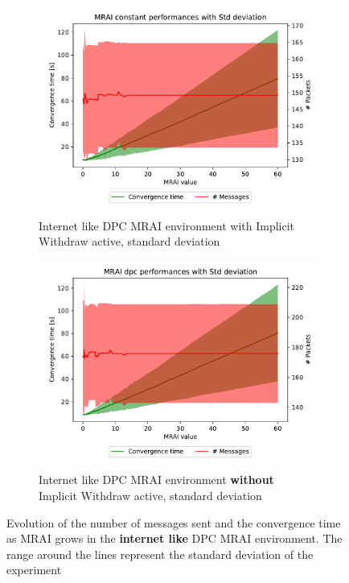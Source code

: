 \documentclass[10pt,conference,letterpaper]{IEEEtran}
\newcommand{\figwidth}{0.78}
\newcommand{\figvspace}{-1.5em}
\begin{document}
\begin{figure}[tb]
	\centering

	\begin{subfigure}{\columnwidth}
		\centering
		\includegraphics[width=\figwidth\columnwidth]{images/internet_like/graph-100-dpc/mrai_evolution_std_alpha}
		\caption{Internet like \ac{DPC} \ac{MRAI} environment with Implicit Withdraw active, standard deviation}
		\label{fig:dpc_mrai_evolution_IW_std}
		\qquad
	\end{subfigure}

	\begin{subfigure}{\columnwidth}
		\centering
		\includegraphics[width=\figwidth\columnwidth]{images/internet_like/graph-100-dpc-noIW/mrai_evolution_std_alpha}
		\caption{Internet like \ac{DPC} \ac{MRAI} environment \textbf{without} Implicit Withdraw active, standard deviation}
		\label{fig:dpc_mrai_evolution_noIW_std}
		\qquad
	\end{subfigure}

	\caption{Evolution of the number of messages sent and the convergence time as \ac{MRAI} grows
		in the \textbf{internet like} \ac{DPC} \ac{MRAI} environment. The range around the lines
		represent the standard deviation of the experiment}
	\label{fig:dpc_mrai_evolution_std}
	\vspace{\figvspace}
\end{figure}
\end{document}
